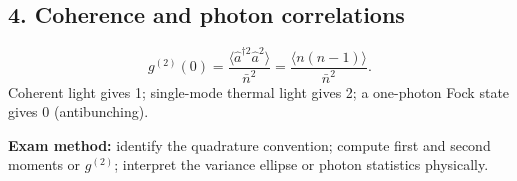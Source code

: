 \subsection*{4. Coherence and photon correlations}
\[
\boxed{g^{(2)}(0)=
\frac{\langle\hat a^{\dagger2}\hat a^2\rangle}{\bar n^2}
=\frac{\langle n(n-1)\rangle}{\bar n^2}.}
\]
Coherent light gives 1; single-mode thermal light gives 2;
a one-photon Fock state gives 0 (antibunching).
\begin{methodbox}
\textbf{Exam method:} identify the quadrature convention;
compute first and second moments or \(g^{(2)}\);
interpret the variance ellipse or photon statistics physically.
\end{methodbox}
